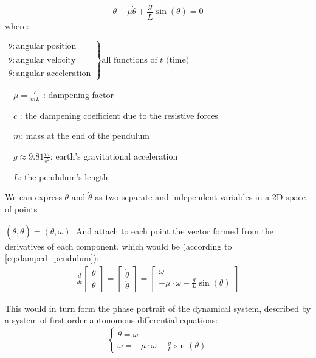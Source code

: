 \begin{equation}\label{eq:damped_pendulum}
	\ddot{\theta} +\mu\dot{\theta} + \frac{g}{L}\sin(\theta) = 0
\end{equation}
where:  \par
$
\left.
\begin{array}{l}
	\theta : \text{angular position}       \\
	\dot{\theta} : \text{angular velocity} \\
	\ddot{\theta} : \text{angular acceleration}
\end{array}
\right\}
\text{all functions of } t \text{ (time)}
$

\ \ $\mu = \frac{c}{mL}$ : dampening factor \par
\ \ $c$ : the dampening coefficient due to the resistive forces \par
\ \ $m$: mass at the end of the pendulum \par
\ \ $g \approx 9.81 \frac{m}{s^2}$: earth's gravitational acceleration \par
\ \ $L$: the pendulum's length \par

We can express $\theta$ and $\dot{\theta}$ as two separate and independent variables in a 2D space of points \par $(\theta,\dot{\theta}) = (\theta,\omega)$.
And attach to each point the vector formed from the derivatives of each component, which would be (according to \ref{eq:damped_pendulum}):
\begin{align}
\frac{d}{dt}
\begin{bmatrix}
	\theta \\
	\dot{\theta}
\end{bmatrix} =
\begin{bmatrix}
	\dot{\theta} \\
	\ddot{\theta}
\end{bmatrix} =
\begin{bmatrix}
	\omega \\
	-\mu \cdot \omega - \frac{g}{L}\sin(\theta)
\end{bmatrix}
\end{align}

This would in turn form the phase portrait of the dynamical system, described by a system of first-order autonomous differential equations:
\[
\begin{cases}
	\dot{\theta}  = \omega \\
	\dot{\omega} = -\mu \cdot \omega - \frac{g}{L}\sin(\theta)
\end{cases}
\]

